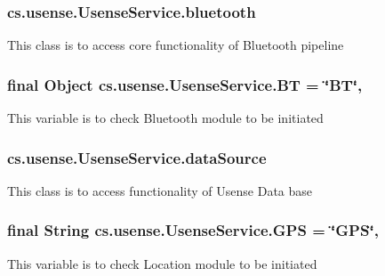 \subsubsection[{bluetooth}]{ cs.\+usense.\+Usense\+Service.\+bluetooth\hspace{0.3cm}{\ttfamily [private]}}\label{classcs_1_1usense_1_1_usense_service_ac1def6b6926720ac65169b1c45bcca02}
This class is to access core functionality of Bluetooth pipeline \hypertarget{classcs_1_1usense_1_1_usense_service_a9aa9f695b19d30971c75c182c744f0eb}{}
\subsubsection[{B\+T}]{\setlength{\rightskip}{0pt plus 5cm}final Object cs.\+usense.\+Usense\+Service.\+B\+T = \char`\"{}B\+T\char`\"{}\hspace{0.3cm}{\ttfamily [static]}, {\ttfamily [private]}}\label{classcs_1_1usense_1_1_usense_service_a9aa9f695b19d30971c75c182c744f0eb}
This variable is to check Bluetooth module to be initiated \hypertarget{classcs_1_1usense_1_1_usense_service_a9474e65ad523c9db7405f7216bd89e7a}{}
\subsubsection[{data\+Source}]{ cs.\+usense.\+Usense\+Service.\+data\+Source\hspace{0.3cm}{\ttfamily [private]}}\label{classcs_1_1usense_1_1_usense_service_a9474e65ad523c9db7405f7216bd89e7a}
This class is to access functionality of Usense Data base \hypertarget{classcs_1_1usense_1_1_usense_service_a725424fc8ea92ac915d016e55328b6fe}{}
\subsubsection[{G\+P\+S}]{\setlength{\rightskip}{0pt plus 5cm}final String cs.\+usense.\+Usense\+Service.\+G\+P\+S = \char`\"{}G\+P\+S\char`\"{}\hspace{0.3cm}{\ttfamily [static]}, {\ttfamily [private]}}\label{classcs_1_1usense_1_1_usense_service_a725424fc8ea92ac915d016e55328b6fe}
This variable is to check Location module to be initiated \hypertarget{classcs_1_1usense_1_1_usense_service_a71cb28de66ce79c32cc7bb9cf8299c1a}{}
